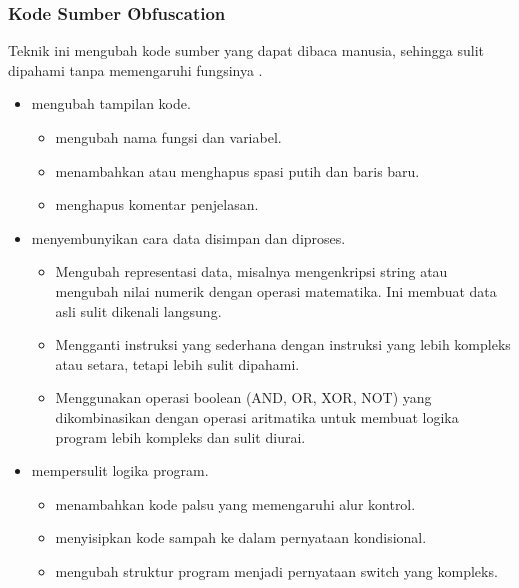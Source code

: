 \subsubsection{Kode Sumber \f{Obfuscation}}
Teknik ini mengubah kode sumber yang dapat dibaca manusia, sehingga sulit dipahami tanpa memengaruhi fungsinya \cite{Jin24}.
\begin{itemize}
	\item {} mengubah tampilan kode.
	      \begin{itemize}
		      \item {} mengubah nama fungsi dan variabel.
		      \item {} menambahkan atau menghapus spasi putih dan baris baru.
		      \item {} menghapus komentar penjelasan.
	      \end{itemize}
	\item {} menyembunyikan cara data disimpan dan diproses.
	      \begin{itemize}
		      \item {} Mengubah representasi data, misalnya mengenkripsi string atau mengubah nilai numerik dengan operasi matematika. Ini membuat data asli sulit dikenali langsung.
		      \item {} Mengganti instruksi yang sederhana dengan instruksi yang lebih kompleks atau setara, tetapi lebih sulit dipahami.
		      \item {} Menggunakan operasi boolean (AND, OR, XOR, NOT) yang dikombinasikan dengan operasi aritmatika untuk membuat logika program lebih kompleks dan sulit diurai.
	      \end{itemize}
	\item {} mempersulit logika program.
	      \begin{itemize}
		      \item {} menambahkan kode palsu yang memengaruhi alur kontrol.
		      \item {} menyisipkan kode sampah ke dalam pernyataan kondisional.
		      \item {} mengubah struktur program menjadi pernyataan switch yang kompleks.
	      \end{itemize}
\end{itemize}

